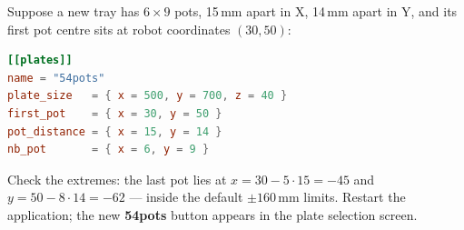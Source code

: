 Suppose a new tray has $6 \times 9$ pots, 15\,mm apart in X, 14\,mm apart in Y, and
its first pot centre sits at robot coordinates $(30, 50)$:

\begin{lstlisting}[language=TOML]
[[plates]]
name = "54pots"
plate_size   = { x = 500, y = 700, z = 40 }
first_pot    = { x = 30, y = 50 }
pot_distance = { x = 15, y = 14 }
nb_pot       = { x = 6, y = 9 }
\end{lstlisting}

Check the extremes: the last pot lies at
$x = 30 - 5 \cdot 15 = -45$ and $y = 50 - 8 \cdot 14 = -62$ --- inside the default
$\pm 160$\,mm limits. Restart the application; the new \textbf{54pots} button appears
in the plate selection screen.
